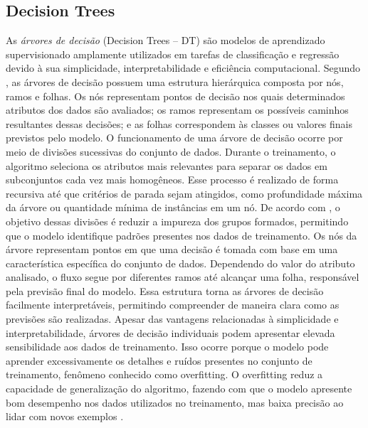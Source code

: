 \documentclass[
    12pt,                %
    openright,           %
    oneside,             %
    a4paper,             %
    english,             %
    brazil               %
]{abntex2}
\begin{document}
\subsection{Decision Trees}
As \textit{árvores de decisão} (Decision Trees – DT) são modelos de aprendizado supervisionado amplamente utilizados em tarefas de classificação e regressão devido à sua simplicidade, interpretabilidade e eficiência computacional. Segundo , as árvores de decisão possuem uma estrutura hierárquica composta por nós, ramos e folhas. Os nós representam pontos de decisão nos quais determinados atributos dos dados são avaliados; os ramos representam os possíveis caminhos resultantes dessas decisões; e as folhas correspondem às classes ou valores finais previstos pelo modelo.
O funcionamento de uma árvore de decisão ocorre por meio de divisões sucessivas do conjunto de dados. Durante o treinamento, o algoritmo seleciona os atributos mais relevantes para separar os dados em subconjuntos cada vez mais homogêneos. Esse processo é realizado de forma recursiva até que critérios de parada sejam atingidos, como profundidade máxima da árvore ou quantidade mínima de instâncias em um nó. De acordo com , o objetivo dessas divisões é reduzir a impureza dos grupos formados, permitindo que o modelo identifique padrões presentes nos dados de treinamento.
Os nós da árvore representam pontos em que uma decisão é tomada com base em uma característica específica do conjunto de dados. Dependendo do valor do atributo analisado, o fluxo segue por diferentes ramos até alcançar uma folha, responsável pela previsão final do modelo. Essa estrutura torna as árvores de decisão facilmente interpretáveis, permitindo compreender de maneira clara como as previsões são realizadas.
Apesar das vantagens relacionadas à simplicidade e interpretabilidade, árvores de decisão individuais podem apresentar elevada sensibilidade aos dados de treinamento. Isso ocorre porque o modelo pode aprender excessivamente os detalhes e ruídos presentes no conjunto de treinamento, fenômeno conhecido como overfitting. O overfitting reduz a capacidade de generalização do algoritmo, fazendo com que o modelo apresente bom desempenho nos dados utilizados no treinamento, mas baixa precisão ao lidar com novos exemplos \cite{Breiman1984}.
\end{document}
